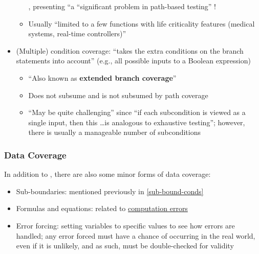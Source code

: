 \begin{itemize}
\begin{itemize}
                        \citep[p.~439]{PetersAndPedrycz2000}, presenting ``a
                        ``significant problem in path-based testing''
                        \citep[p.~5-5]{SWEBOK2024}!
                  \item Usually ``limited to a few functions with life
                        criticality features (medical systems, real-time
                        controllers)'' \citep[p.~481]{PetersAndPedrycz2000}
            \end{itemize}
      \item (Multiple) condition coverage: ``takes the extra conditions on the
            branch statements into account'' (e.g., all possible inputs to a
            Boolean expression) \citep[p.~120]{Patton2006}
            \begin{itemize}
                  \item ``Also known as \textbf{extended branch coverage}''
                        \citep[p.~422]{vanVliet2000}
                  \item Does not subsume and is not subsumed by path coverage
                        \citep[p.~433]{vanVliet2000}
                  \item ``May be quite challenging'' since ``if each
                        subcondition is viewed as a single input, then this
                        \dots is analogous to exhaustive testing''; however,
                        there is usually a manageable number of subconditions
                        \citep[p.~464]{PetersAndPedrycz2000}
            \end{itemize}
\end{itemize}

\subsubsection{Data Coverage \citep[pp.~114-116]{Patton2006}}

In addition to , there are also some minor forms of
data coverage:

\begin{itemize}
      \item Sub-boundaries: mentioned previously in \ref{sub-bound-conds}
      \item Formulas and equations: related to
            \hyperref[comp-errors]{computation errors}
      \item Error forcing: setting variables to specific values to see how
            errors are handled; any error forced must have a chance of
            occurring in the real world, even if it is unlikely, and as such,
            must be double-checked for validity
            \citep[p.~116]{Patton2006}
\end{itemize}

